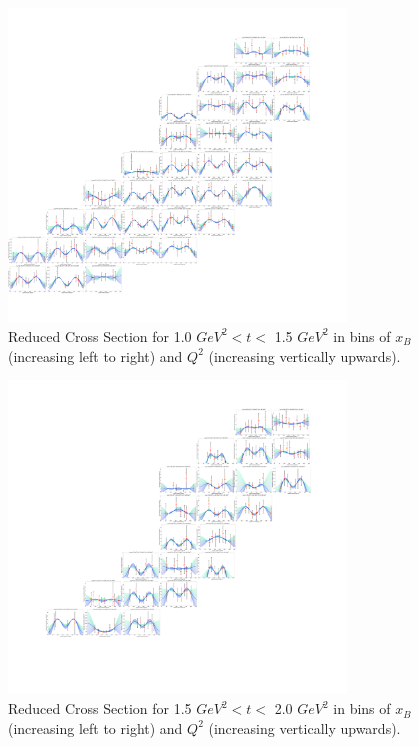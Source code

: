         \begin{figure}[ht]
            \centering
            \includegraphics[trim={14.6cm 4cm 15.2cm 4cm},clip,width=0.8\textwidth]{Chapters/Ch5-Further/c12xsec/combined_t1.0.png}
            \caption[Reduced Cross Section for 1.0 $GeV^2 < t <$ 1.5 $ GeV^2$]{Reduced Cross Section for 1.0 $ GeV^2 < t <$ 1.5 $GeV^2$ in bins of $x_B$ (increasing left to right) and $Q^2$ (increasing vertically upwards). }
            \label{fig:combined_t1.0}
        \end{figure}
        
        \begin{figure}[ht]
            \centering
            \includegraphics[trim={14.6cm 4cm 15.2cm 4cm},clip,width=0.8\textwidth]{Chapters/Ch5-Further/c12xsec/combined_t1.5.png}
            \caption[Reduced Cross Section for 1.5 $GeV^2 < t <$ 2.0 $ GeV^2$]{Reduced Cross Section for 1.5 $ GeV^2 < t <$ 2.0 $GeV^2$ in bins of $x_B$ (increasing left to right) and $Q^2$ (increasing vertically upwards). }
            \label{fig:combined_t1.5}
        \end{figure}

